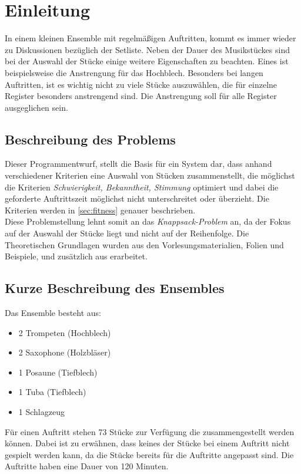 \section{Einleitung}\label{sec:einleitung}
In einem kleinen Ensemble mit regelmäßigen Auftritten, kommt es immer wieder zu Diskussionen 
bezüglich der Setliste. Neben der Dauer des Musikstückes sind bei der Auswahl der Stücke einige 
weitere Eigenschaften zu beachten. Eines ist beispielsweise die Anstrengung für das Hochblech. 
Besonders bei langen Auftritten, ist es wichtig nicht zu viele Stücke auszuwählen, die 
für einzelne Register besonders anstrengend sind. Die Anstrengung soll für alle Register ausgeglichen sein.
\subsection{Beschreibung des Problems}
 Dieser Programmentwurf, stellt die Basis für ein System dar, dass anhand verschiedener Kriterien eine 
 Auswahl von Stücken zusammenstellt, die möglichst die Kriterien \emph{Schwierigkeit, Bekanntheit, Stimmung} optimiert und dabei die 
 geforderte Auftrittszeit möglichst nicht unterschreitet oder überzieht. Die Kriterien werden in \autoref{sec:fitness} genauer 
 beschrieben.\\
 Diese Problemstellung lehnt somit an das \textit{Knappsack-Problem} an, 
 da der Fokus auf der Auswahl der Stücke liegt und nicht auf der Reihenfolge.
 Die Theoretischen Grundlagen wurden aus den Vorlesungsmaterialien, Folien und Beispiele, und zusätzlich
aus \cite{keller:2000} erarbeitet.
\subsection{Kurze Beschreibung des Ensembles}
Das Ensemble besteht aus: 
\begin{itemize}
    \item 2 Trompeten (Hochblech)
    \item 2 Saxophone (Holzbläser)
    \item 1 Posaune (Tiefblech)
    \item 1 Tuba (Tiefblech)
    \item 1 Schlagzeug 
\end{itemize} 

Für einen Auftritt stehen 73 Stücke zur Verfügung die zusammengestellt werden können. Dabei ist zu erwähnen, dass keines
der Stücke bei einem Auftritt nicht gespielt werden kann, da die Stücke bereits für die Auftritte angepasst sind.
Die Auftritte haben eine Dauer von 120 Minuten.